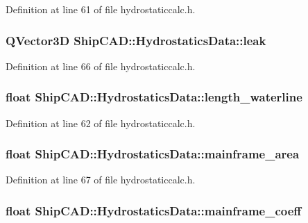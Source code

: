 Definition at line 61 of file hydrostaticcalc.\-h.

\hypertarget{structShipCAD_1_1HydrostaticsData_a1132babc4274499418c2dc8ea6f86314}{
\subsubsection[{leak}]{\setlength{\rightskip}{0pt plus 5cm}Q\-Vector3\-D Ship\-C\-A\-D\-::\-Hydrostatics\-Data\-::leak}}\label{structShipCAD_1_1HydrostaticsData_a1132babc4274499418c2dc8ea6f86314}


Definition at line 66 of file hydrostaticcalc.\-h.

\hypertarget{structShipCAD_1_1HydrostaticsData_ae65aa54bcbfb059f11aa174cfaa0447b}{
\subsubsection[{length\-\_\-waterline}]{\setlength{\rightskip}{0pt plus 5cm}float Ship\-C\-A\-D\-::\-Hydrostatics\-Data\-::length\-\_\-waterline}}\label{structShipCAD_1_1HydrostaticsData_ae65aa54bcbfb059f11aa174cfaa0447b}


Definition at line 62 of file hydrostaticcalc.\-h.

\hypertarget{structShipCAD_1_1HydrostaticsData_ab2b49d5dea89ae998116c8ff4cac2b53}{
\subsubsection[{mainframe\-\_\-area}]{\setlength{\rightskip}{0pt plus 5cm}float Ship\-C\-A\-D\-::\-Hydrostatics\-Data\-::mainframe\-\_\-area}}\label{structShipCAD_1_1HydrostaticsData_ab2b49d5dea89ae998116c8ff4cac2b53}


Definition at line 67 of file hydrostaticcalc.\-h.

\hypertarget{structShipCAD_1_1HydrostaticsData_a4208b97fe6110516d71e67708186897a}{
\subsubsection[{mainframe\-\_\-coeff}]{\setlength{\rightskip}{0pt plus 5cm}float Ship\-C\-A\-D\-::\-Hydrostatics\-Data\-::mainframe\-\_\-coeff}}\label{structShipCAD_1_1HydrostaticsData_a4208b97fe6110516d71e67708186897a}



